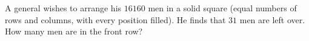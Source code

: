 A general wishes to arrange his $16160$ men in a solid square (equal numbers of rows and columns, with every position filled). He finds that $31$ men are left over. How many men are in the front row?
